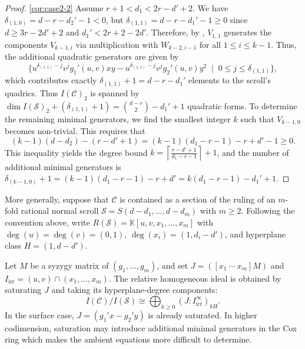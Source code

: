 \documentclass[a4paper, 11pt]{amsart}
\numberwithin{theorem}{section}
\theoremstyle{definition}
\numberwithin{equation}{section}
\begin{document}
\begin{proof}
\eqref{cor:case2-2}
Assume $r+1 < d_1 < 2r-d'+2$. 
We have $\delta_{(1,0)} = d-r-d_2'-1 < 0$, but $\delta_{(1,1)} = d-r-d_1'-1 \geq 0$ since $d \geq 3r-2d'+2$ and $d_1' < 2r+2-2d'$. 
Therefore, by , $V_{1,1}$ generates the components $V_{k-1,i}$ via multiplication with $W_{k-2,i-1}$ for all $1\leq i \leq k-1$.
Thus, the additional quadratic generators are given by
\[
\{u^{\delta_{(1,1)}-j} v^j g_1'(u,v) x y - u^{\delta_{(1,1)}-j} v^j g_2'(u,v) y^2 \;\mid\; 0 \leq j \leq \delta_{(1,1)}\},
\]
which contributes exactly $\delta_{(1,1)}+1 = d-r-d_1'$ elements to the scroll's quadrics.
Thus $I(\mathcal{C})_2$ is spanned by $\dim I(\mathcal{S})_2 + (\delta_{(1,1)}+1) = \binom{d-r}{2} - d_1' + 1$ quadratic forms.
To determine the remaining minimal generators, we find the smallest integer $k$ such that $V_{k-1,0}$ becomes non-trivial. 
This requires that
\[
(k-1)(d-d_2) - (r-d'+1) = (k-1)(d_1-r-1)-r+d'-1 \geq 0.
\]
This inequality yields the degree bound $k = \left\lceil \frac{r-d'+1}{d_1-r-1} \right\rceil + 1$, and the number of additional minimal generators is $\delta_{(k-1,0)} +1 = (k-1)(d_1-r-1)-r+d' = k(d_1-r-1)-d_1'+1$.
\end{proof}
More generally, suppose that $\mathcal C$ is contained as a section of the ruling of an $m$-fold rational normal scroll $\mathcal S=S(d-d_1,\dots,d-d_m)$ with $m\ge2$.
Following the convention above, write $R(\mathcal S)=\mathbb K[u,v,x_1,\dots,x_m]$ with $\deg(u)=\deg(v)=(0,1)$, $\deg(x_i)=(1,d_i-d')$, and hyperplane class $H=(1,d-d')$.

Let $M$ be a syzygy matrix of $(g_1,\dots,g_m)$, and set $J=([x_1\ \cdots\ x_m]M)$ and $I_{\mathrm{irr}}=(u,v)\cap(x_1,\dots,x_m)$.
The relative homogeneous ideal is obtained by saturating $J$ and taking its hyperplane-degree components:
\[
I(\mathcal C)/I(\mathcal S) \cong \bigoplus_{k\ge0}(J:I_{\mathrm{irr}}^\infty)_{kH}.
\]
In the surface case, $J=(g_1'x-g_2'y)$ is already saturated.
In higher codimension, saturation may introduce additional
minimal generators in the Cox ring which makes the ambient equations more difficult to determine.
\end{document}
